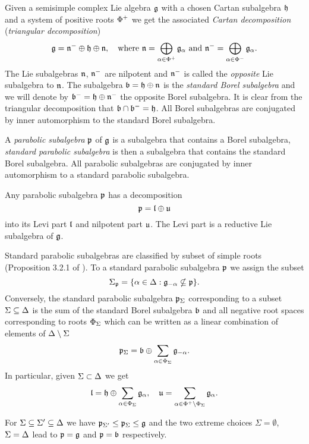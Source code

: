 \documentclass[12pt,a4paper,final]{report}
\begin{document}
Given a semisimple complex Lie algebra $\mathfrak{g}$ with a chosen Cartan subalgebra $\mathfrak{h}$ and a system of positive roots $\Phi^+$ we get the associated \emph{Cartan decomposition} (\emph{triangular decomposition}) 
\[
 \mathfrak{g} = \mathfrak{n}^- \oplus \mathfrak{h} \oplus \mathfrak{n}, \quad \text{where } \mathfrak{n} = \bigoplus_{\alpha \in \Phi^+} \mathfrak{g}_\alpha \text{ and } \mathfrak{n}^- = \bigoplus_{\alpha \in \Phi^-} \mathfrak{g}_\alpha.
\]
The Lie subalgebras $\mathfrak{n}$, $\mathfrak{n}^-$ are nilpotent and $\mathfrak{n}^-$ is called the \emph{opposite} Lie subalgebra to $\mathfrak{n}$. The subalgebra $\mathfrak{b} = \mathfrak{h}\oplus \mathfrak{n}$ is the \emph{standard Borel subalgebra} and we will denote by $\mathfrak{b}^- = \mathfrak{h}\oplus \mathfrak{n}^-$ the opposite  Borel subalgebra. It is clear from the triangular  decomposition that $\mathfrak{b}\cap\mathfrak{b}^- = \mathfrak{h}$. All Borel subalgebras are conjugated by inner automorphism to the standard Borel subalgebra.

A \emph{parabolic subalgebra} $\mathfrak{p}$ of $\mathfrak{g}$ is a subalgebra that contains a Borel subalgebra, \emph{standard parabolic subalgebra} is then a subalgebra that contains the standard Borel subalgebra. All parabolic subalgebras are conjugated by inner automorphism to a standard parabolic subalgebra.

Any parabolic subalgebra $\mathfrak{p}$ has a decomposition
\[
 \mathfrak{p} = \mathfrak{l} \oplus \mathfrak{u}
\]
into its Levi part $\mathfrak{l}$ and nilpotent part $\mathfrak{u}$. The Levi part is a reductive Lie subalgebra of $\mathfrak{g}$.

Standard parabolic subalgebras are classified by subset of simple roots (Proposition 3.2.1 of \cite{cap_parabolic_2009}). To a standard parabolic subalgebra $\mathfrak{p}$ we assign the subset \[\Sigma_{\mathfrak{p}} = \{ \alpha\in\Delta : \mathfrak{g}_{-\alpha}\nsubseteq \mathfrak{p} \}.\] Conversely, the standard parabolic subalgebra $\mathfrak{p}_\Sigma$ corresponding to a subset $\Sigma \subseteq \Delta$ is the sum of the standard Borel subalgebra $\mathfrak{b}$ and all negative root spaces corresponding to roots $\Phi_\Sigma$ which can be written as a linear combination of elements of $\Delta \setminus \Sigma$
\[
 \mathfrak{p}_\Sigma = \mathfrak{b} \oplus \sum_{\alpha \in \Phi_\Sigma} \mathfrak{g}_{-\alpha}.
\]
In particular, given $\Sigma \subset \Delta$ we get
\[
 \mathfrak{l} = \mathfrak{h} \oplus \sum_{\alpha \in \Phi_\Sigma} \mathfrak{g}_\alpha, \quad \mathfrak{u} = \sum_{\alpha \in \Phi^+ \setminus \Phi_\Sigma} \mathfrak{g}_{\alpha}.
\]

For $\Sigma \subseteq \Sigma' \subseteq \Delta$ we have $\mathfrak{p}_{\Sigma'} \leq \mathfrak{p}_\Sigma \leq \mathfrak{g}$ and the two extreme choices $\Sigma = \emptyset$, $\Sigma = \Delta$ lead to $\mathfrak{p}= \mathfrak{g}$ and $\mathfrak{p} = \mathfrak{b}$ respectively.
\end{document}
